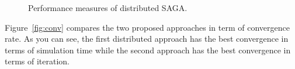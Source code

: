 \documentclass[a4paper,10pt]{article}
\newcommand{\figref}[1]{Figure~\ref{fig:#1}}
\begin{document}
\begin{figure}[ht]
	\centering
	\hspace{0pt}
	\hspace{0pt}
	\caption{Performance measures of distributed SAGA.}
	\label{fig:distributed_perf}
\end{figure}

\figref{conv} compares the two proposed approaches in term of convergence
rate. As you can see, the first distributed approach has the best convergence in
terms of simulation time while the second approach has the best convergence in
terms of iteration.
\end{document}
